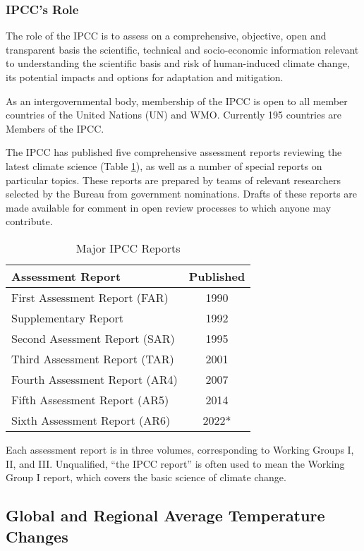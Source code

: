 \documentclass{article}\usepackage[]{graphicx}\usepackage[]{color}
\begin{document}
\subsubsection{IPCC's Role}

The role of the IPCC is to assess on a comprehensive, objective, open and transparent basis the scientific, technical and socio-economic information relevant to understanding the scientific basis and risk of human-induced climate change, its potential impacts and options for adaptation and mitigation.

As an intergovernmental body, membership of the IPCC is open to all member countries of the United Nations (UN) and WMO. Currently 195 countries are Members of the IPCC.

The IPCC has published five comprehensive assessment reports reviewing the latest climate science (Table \ref{tab:IPCC}), as well as a number of special reports on particular topics. These reports are prepared by teams of relevant researchers selected by the Bureau from government nominations. Drafts of these reports are made available for comment in open review processes to which anyone may contribute.

\begin{table}
\caption{Major IPCC Reports}\label{tab:IPCC}
\centering
\begin{tabular}{lc}\hline
Assessment Report             & Published \\ \hline\hline
First Assessment Report (FAR) & 1990    \\
Supplementary Report          & 1992   \\
Second Asessment Report (SAR) & 1995    \\
Third Assessment Report (TAR) & 2001    \\
Fourth Assessment Report (AR4)& 2007   \\
Fifth Assessment Report (AR5) & 2014  \\
Sixth Assessment Report (AR6) & 2022*  \\ \hline
\end{tabular}
\end{table}

Each assessment report is in three volumes, corresponding to Working Groups I, II, and III. Unqualified, ``the IPCC report'' is often used to mean the Working Group I report, which covers the basic science of climate change.

\subsection{Global and Regional Average Temperature Changes}
\end{document}
